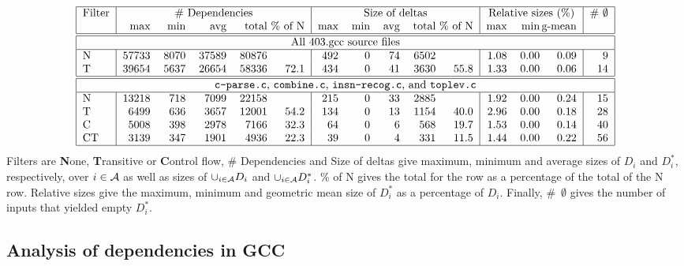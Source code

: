 \documentclass[times, 10pt,twocolumn]{article}
\begin{document}
\begin{table*}
\[
\begin{tabular}{|l|rrrr@{\ }r|rrrr@{\ }r|rr@{\,}r|r|} \hline
Filter & \multicolumn{5}{c|}{\# Dependencies} 
     & \multicolumn{5}{c|}{Size of deltas}
     & \multicolumn{3}{c|}{Relative sizes (\%)}
     & \# $\emptyset$  \\
     & max & min & avg & total & \% of N
     & max & min & avg & total & \% of N
     & max & min & g-mean & \\ \hline \hline
\multicolumn{15}{|c|}{ All 403.gcc source files } \\ \hline
N & 57733 & 8070 & 37589  & 80876 &  & 492 & 0 & 74  & 6502 &  & 1.08 & 0.00 & 0.09 & 9 \\
T & 39654 & 5637 & 26654  & 58336 & 72.1  & 434 & 0 & 41  & 3630 & 55.8  & 1.33 & 0.00 & 0.06 & 14 \\
\hline \hline
\multicolumn{15}{|c|}{ {\tt c-parse.c}, {\tt combine.c}, 
  {\tt insn-recog.c}, and {\tt toplev.c} } \\
\hline
N & 13218 & 718 & 7099  & 22158 &  & 215 & 0 & 33  & 2885 &  & 1.92 & 0.00 & 0.24 & 15 \\
T & 6499 & 636 & 3657  & 12001 & 54.2  & 134 & 0 & 13  & 1154 & 40.0  & 2.96 & 0.00 & 0.18 & 28 \\
C & 5008 & 398 & 2978  & 7166 & 32.3  & 64 & 0 & 6  & 568 & 19.7  & 1.53 & 0.00 & 0.14 & 40 \\
CT & 3139 & 347 & 1901  & 4936 & 22.3  & 39 & 0 & 4  & 331 & 11.5  & 1.44 & 0.00 & 0.22 & 56 \\
\hline
\end{tabular}
\]
Filters are {\bf N}one, {\bf T}ransitive or {\bf C}ontrol flow, \# Dependencies and Size of deltas
give maximum, minimum and average sizes of $D_i$ and $D_i^{\ast}$, respectively, over $i\in \cal A$
as well as sizes of $\cup_{i \in \cal A} D_i$ and $\cup_{i \in \cal A} D_i^{\ast}$. \% of N gives 
the total for the row as a percentage of the total of the N row. Relative sizes give the maximum, 
minimum and geometric mean size of $D_i^{\ast}$ as a percentage of $D_i$. Finally, \#~$\emptyset$
gives the number of inputs that yielded empty $D_i^{\ast}$.
\caption{Dependence statistics} \label{tdepstat}
\end{table*}

\subsection{Analysis of dependencies in GCC}
\end{document}
